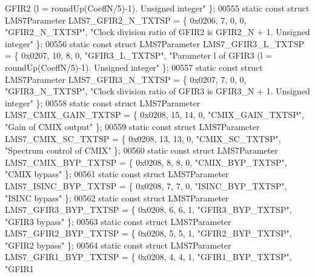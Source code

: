 \begin{DoxyCode}
{       GFIR2 (l = roundUp(CoeffN/5)-1). Unsigned integer"} \};
00555 \textcolor{keyword}{static} \textcolor{keyword}{const} \textcolor{keyword}{struct }LMS7Parameter LMS7_GFIR2_N_TXTSP = \{ 0x0206, 7, 0, 0, \textcolor{stringliteral}{"GFIR2\_N\_TXTSP"}, \textcolor{stringliteral}{"Clock division
       ratio of GFIR2 is GFIR2\_N + 1. Unsigned integer"} \};
00556 \textcolor{keyword}{static} \textcolor{keyword}{const} \textcolor{keyword}{struct }LMS7Parameter LMS7_GFIR3_L_TXTSP = \{ 0x0207, 10, 8, 0, \textcolor{stringliteral}{"GFIR3\_L\_TXTSP"}, \textcolor{stringliteral}{"Parameter l of
       GFIR3 (l = roundUp(CoeffN/5)-1). Unsigned integer"} \};
00557 \textcolor{keyword}{static} \textcolor{keyword}{const} \textcolor{keyword}{struct }LMS7Parameter LMS7_GFIR3_N_TXTSP = \{ 0x0207, 7, 0, 0, \textcolor{stringliteral}{"GFIR3\_N\_TXTSP"}, \textcolor{stringliteral}{"Clock division
       ratio of GFIR3 is GFIR3\_N + 1. Unsigned integer"} \};
00558 \textcolor{keyword}{static} \textcolor{keyword}{const} \textcolor{keyword}{struct }LMS7Parameter LMS7_CMIX_GAIN_TXTSP = \{ 0x0208, 15, 14, 0, \textcolor{stringliteral}{"CMIX\_GAIN\_TXTSP"}, \textcolor{stringliteral}{"Gain of
       CMIX output"} \};
00559 \textcolor{keyword}{static} \textcolor{keyword}{const} \textcolor{keyword}{struct }LMS7Parameter LMS7_CMIX_SC_TXTSP = \{ 0x0208, 13, 13, 0, \textcolor{stringliteral}{"CMIX\_SC\_TXTSP"}, \textcolor{stringliteral}{"Spectrum
       control of CMIX"} \};
00560 \textcolor{keyword}{static} \textcolor{keyword}{const} \textcolor{keyword}{struct }LMS7Parameter LMS7_CMIX_BYP_TXTSP = \{ 0x0208, 8, 8, 0, \textcolor{stringliteral}{"CMIX\_BYP\_TXTSP"}, \textcolor{stringliteral}{"CMIX bypass"} 
      \};
00561 \textcolor{keyword}{static} \textcolor{keyword}{const} \textcolor{keyword}{struct }LMS7Parameter LMS7_ISINC_BYP_TXTSP = \{ 0x0208, 7, 7, 0, \textcolor{stringliteral}{"ISINC\_BYP\_TXTSP"}, \textcolor{stringliteral}{"ISINC
       bypass"} \};
00562 \textcolor{keyword}{static} \textcolor{keyword}{const} \textcolor{keyword}{struct }LMS7Parameter LMS7_GFIR3_BYP_TXTSP = \{ 0x0208, 6, 6, 1, \textcolor{stringliteral}{"GFIR3\_BYP\_TXTSP"}, \textcolor{stringliteral}{"GFIR3
       bypass"} \};
00563 \textcolor{keyword}{static} \textcolor{keyword}{const} \textcolor{keyword}{struct }LMS7Parameter LMS7_GFIR2_BYP_TXTSP = \{ 0x0208, 5, 5, 1, \textcolor{stringliteral}{"GFIR2\_BYP\_TXTSP"}, \textcolor{stringliteral}{"GFIR2
       bypass"} \};
00564 \textcolor{keyword}{static} \textcolor{keyword}{const} \textcolor{keyword}{struct }LMS7Parameter LMS7_GFIR1_BYP_TXTSP = \{ 0x0208, 4, 4, 1, \textcolor{stringliteral}{"GFIR1\_BYP\_TXTSP"}, \textcolor{stringliteral}{"GFIR1
}
\end{DoxyCode}
